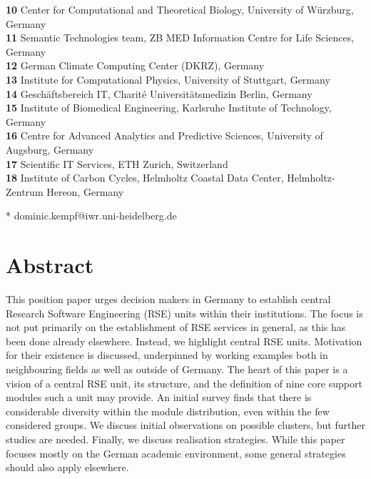 \documentclass[10pt,letterpaper]{article}
\begin{document}
\begin{flushleft}
\textbf{ 10 } Center for Computational and Theoretical Biology, University of Würzburg, Germany
\\
\textbf{ 11 } Semantic Technologies team, ZB MED Information Centre for Life Sciences, Germany
\\
\textbf{ 12 } German Climate Computing Center (DKRZ), Germany
\\
\textbf{ 13 } Institute for Computational Physics, University of Stuttgart, Germany
\\
\textbf{ 14 } Geschäftsbereich IT, Charité Universitätsmedizin Berlin, Germany
\\
\textbf{ 15 } Institute of Biomedical Engineering, Karlsruhe Institute of Technology, Germany
\\
\textbf{ 16 } Centre for Advanced Analytics and Predictive Sciences, University of Augsburg, Germany
\\
\textbf{ 17 } Scientific IT Services, ETH Zurich, Switzerland
\\
\textbf{ 18 } Institute of Carbon Cycles, Helmholtz Coastal Data Center, Helmholtz-Zentrum Hereon, Germany
\\
\bigskip

* dominic.kempf@iwr.uni-heidelberg.de

\end{flushleft}

\section*{Abstract}
This position paper urges decision makers in Germany to establish central Research Software Engineering (RSE) units within their institutions.
The focus is not put primarily on the establishment of RSE services in general, as this has been done already elsewhere.
Instead, we highlight central RSE units.
Motivation for their existence is discussed, underpinned by working examples both in neighbouring fields as well as outside of Germany.
The heart of this paper is a vision of a central RSE unit, its structure, and the definition of nine core support modules such a unit may provide.
An initial survey finds that there is considerable diversity within the module distribution, even within the few considered groups.
We discuss initial observations on possible clusters, but further studies are needed.
Finally, we discuss realisation strategies.
While this paper focuses mostly on the German academic environment, some general strategies should also apply elsewhere.
\end{document}
